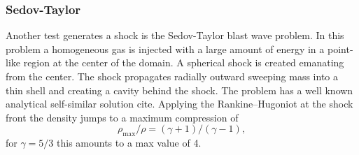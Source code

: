 \subsubsection{Sedov-Taylor}
Another test generates a shock is the Sedov-Taylor blast wave problem. In this problem a homogeneous
gas is injected with a large amount of energy in a point-like region at the center of the domain.
A spherical shock is created emanating from the center. The shock propagates radially outward
sweeping mass into a thin shell and creating a cavity behind the shock. The problem has a well known
analytical self-similar solution cite. Applying the Rankine–Hugoniot at the shock front the density
jumps to a maximum compression of
\begin{equation}
	\rho_{\mathrm{max}}/\rho = (\gamma + 1)/(\gamma - 1),
\end{equation}
for $\gamma = 5/3$ this amounts to a max value of 4.

